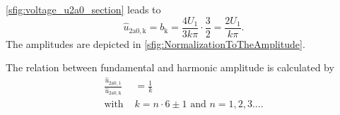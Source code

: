 \begin{solutionblock}
    

    \autoref{sfig:voltage_u2a0_section} leads to
    \begin{equation}
        \hat{u}_\mathrm{2a0,k} = b_\mathrm{k} = \frac{4U_{\mathrm{1}}}{3k\pi} \cdot \frac{3}{2}=\frac{2U_{\mathrm{1}}}{k\pi}.
        \label{eq:Ex07T2_FundamentelVoltage}
    \end{equation}   
    The amplitudes are depicted in \autoref{sfig:NormalizationToTheAmplitude}.
    
    \FloatBarrier
    The relation between fundamental and harmonic amplitude is calculated by
    \begin{equation}
        \begin{split}        
            \frac{\hat{u}_\mathrm{2a0,1}}{\hat{u}_\mathrm{2a0,k}} &= \frac{1}{k} \\
            \text{with } &k=n \cdot 6\pm1 \text{ and } n=1,2,3... .
        \end{split}         
    \end{equation}   
    \label{subtask:Ex07T2_FourierSeries}
 \end{solutionblock}


